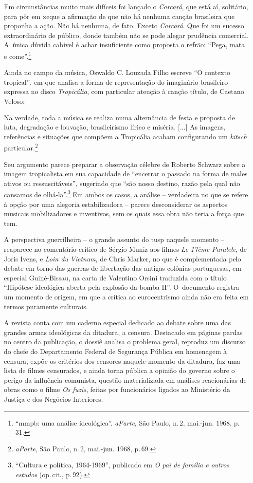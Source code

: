 \startblockquote
Em circunstâncias muito mais difíceis foi lançado o {\it Carcará}, que
está aí, solitário, para pôr em xeque a afirmação de que não há nenhuma
canção brasileira que proponha a ação. Não há nenhuma, de fato. Exceto
{\it Carcará}. Que foi um sucesso extraordinário de público, donde
também não se pode alegar prudência comercial. A~única dúvida cabível é
achar insuficiente como proposta o refrão: “Pega, mata e
come”.\footnote{“{\sc mmpb}: uma análise ideológica”. {\it aParte}, São Paulo,
  n.\,2, mai.-jun. 1968, p.\,31.}
\stopblockquote

Ainda no campo da música, Oswaldo C. Louzada Filho escreve “O
contexto tropical”, em que analisa a forma de representação do
imaginário brasileiro expressa no disco {\it Tropicália}, com particular
atenção à canção título, de Caetano Veloso:

\startblockquote
Na verdade, toda a música se realiza numa alternância de festa e
proposta de luta, degradação e louvação, brasileirismo lírico e miséria.
{[}...{]} As imagens, referências e situações que compõem a Tropicália
acabam configurando um {\it kitsch} particular.\footnote{{\it aParte},
  São Paulo, n.\,2, mai.-jun. 1968, p.\,69.}
\stopblockquote

Seu argumento parece preparar a observação célebre de Roberto Schwarz
sobre a imagem tropicalista em sua
capacidade de “encerrar o passado na forma de males ativos ou
ressuscitáveis”, sugerindo que “são nosso destino, razão pela qual não
cansamos de olhá-la”.\footnote{“Cultura e política, 1964-1969”,
publicado em {\it O pai de família e outros estudos}
  (op.\,cit., p.\,92).} Em ambos os casos, a
análise -- verdadeira no que se refere à opção por uma alegoria
estabilizadora -- parece desconsiderar os aspectos musicais
mobilizadores e inventivos, sem os quais essa obra não teria a força que
tem.

A perspectiva guerrilheira -- o grande assunto do {\sc tusp} naquele momento --
reaparece no comentário crítico de Sérgio Muniz aos filmes {\it Le 17ème
Paralele}, de Joris Ivens, e {\it Loin du Vietnam}, de Chris Marker, no
que é complementada pelo debate em torno das guerras de libertação das
antigas colônias portuguesas, em especial Guiné-Bissau, na carta de
Valentino Orsini traduzida com o título “Hipótese ideológica aberta
pela explosão da bomba H”. O~documento registra um momento de origem, em
que a crítica ao eurocentrismo ainda não era feita em termos puramente
culturais.

A revista conta com um caderno especial dedicado ao debate sobre uma das
grandes armas ideológicas da ditadura, a censura. Destacado em páginas
pardas no centro da publicação, o dossiê analisa o problema geral,
reproduz um discurso do chefe do Departamento Federal de Segurança
Pública em homenagem à censura, expõe os critérios dos censores naquele
momento da ditadura, faz uma lista de filmes censurados, e ainda torna
pública a opinião do governo sobre o perigo da influência comunista,
questão materializada em análises reacionárias de obras como o filme
{\it Os fuzis}, feitas por funcionários ligados ao Ministério da Justiça
e dos Negócios Interiores.

